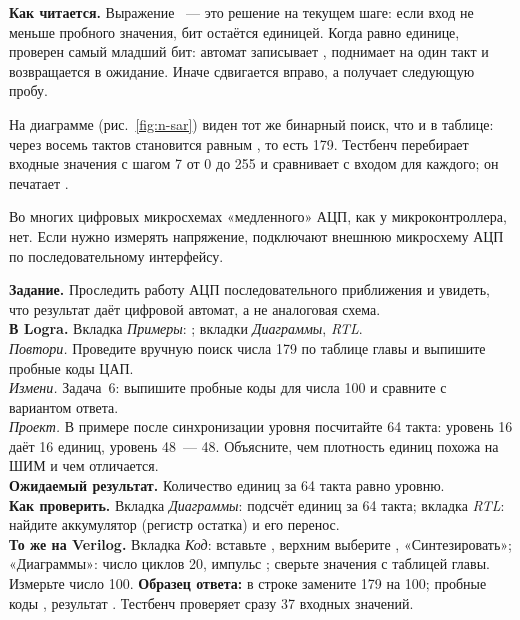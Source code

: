 \textbf{Как читается.} Выражение ~---
это решение на текущем шаге: если вход не меньше пробного значения, бит
остаётся единицей. Когда  равно единице, проверен самый младший
бит: автомат записывает , поднимает  на один такт и
возвращается в ожидание. Иначе  сдвигается вправо, а 
получает следующую пробу.


На диаграмме (рис.~\ref{fig:n-sar}) виден тот же бинарный поиск, что и в
таблице: через восемь тактов  становится равным , то
есть 179. Тестбенч  перебирает входные
значения с шагом 7 от 0 до 255 и сравнивает  с входом для каждого;
он печатает .

\begin{infobox}
Во многих цифровых микросхемах «медленного» АЦП, как у микроконтроллера, нет.
Если нужно измерять напряжение, подключают внешнюю микросхему АЦП по
последовательному интерфейсу. 
\end{infobox}

\begin{diybox}
\textbf{Задание.} Проследить работу АЦП последовательного приближения и
увидеть, что результат даёт цифровой автомат, а не аналоговая схема.\\
\textbf{В Logra.} Вкладка \emph{Примеры}: ;
вкладки \emph{Диаграммы}, \emph{RTL}.\\
 \emph{Повтори.} Проведите вручную поиск числа 179 по таблице главы
и выпишите пробные коды ЦАП.\\
 \emph{Измени.} Задача~6: выпишите пробные коды для числа 100 и
сравните с вариантом ответа.\\
 \emph{Проект.} В примере  после синхронизации
уровня посчитайте 64 такта: уровень 16 даёт 16 единиц, уровень 48~--- 48.
Объясните, чем плотность единиц похожа на ШИМ и чем отличается.\\
\textbf{Ожидаемый результат.} Количество единиц за 64 такта равно уровню.\\
\textbf{Как проверить.} Вкладка \emph{Диаграммы}: подсчёт единиц за 64 такта;
вкладка \emph{RTL}: найдите аккумулятор (регистр остатка) и его перенос.\\
\textbf{То же на Verilog.} Вкладка \emph{Код}: вставьте , верхним
выберите , «Синтезировать»; «Диаграммы»: число циклов 20,
импульс ; сверьте значения  с таблицей главы.
 Измерьте число 100. \textbf{Образец ответа:} в строке
 замените 179 на 100; пробные коды
, результат .
Тестбенч  проверяет сразу 37 входных значений.
\end{diybox}

